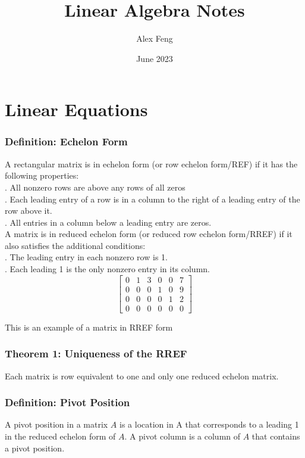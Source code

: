 \documentclass{article}
\title{Linear Algebra Notes}
\author{Alex Feng}
\date{June 2023}
\begin{document}
\maketitle

\section{Linear Equations}
\subsubsection*{Definition: Echelon Form}
A rectangular matrix is in echelon form (or row echelon form/REF) if it has the following properties:
\\. All nonzero rows are above any rows of all zeros
\\. Each leading entry of a row is in a column to the right of a leading entry \indent  of the row above it.
\\. All entries in a column below a leading entry are zeros. 
\\A matrix is in reduced echelon form (or reduced row echelon form/RREF) if it also satisfies the additional conditions:
\\. The leading entry in each nonzero row is 1.
\\. Each leading 1 is the only nonzero entry in its column. 
\\
$$\begin{bmatrix}
0 & 1 & 3 & 0 & 0 & 7 \\
0 & 0 & 0 & 1 & 0 & 9 \\
0 & 0 & 0 & 0 & 1 & 2 \\
0 & 0 & 0 & 0 & 0 & 0 
\end{bmatrix}$$
\begin{center}This is an example of a matrix in RREF form
\end{center}
\subsubsection*{Theorem 1: Uniqueness of the RREF}
Each matrix is row equivalent to one and only one reduced echelon matrix. 
\subsubsection*{Definition: Pivot Position}
A pivot position in a matrix $A$ is a location in A that corresponds to a leading 1 in the reduced echelon form of $A$. A pivot column is a column of $A$ that contains a pivot position. 
\end{document}

